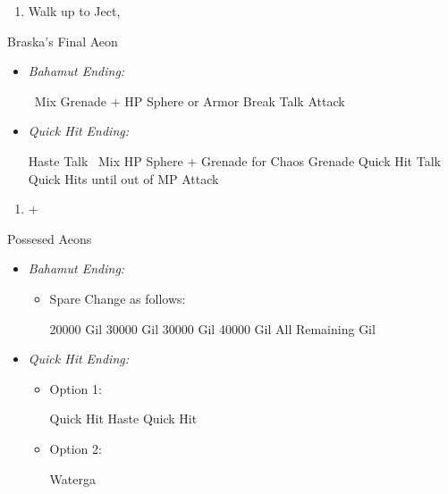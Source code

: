 \begin{multicols}{2}
\begin{enumerate}[resume]
	\item Walk up to Ject, \cs[4:30]
\end{enumerate}
\begin{battle}[180000]{Braska's Final Aeon}
\begin{itemize}
	\item \textit{Bahamut Ending:}
	\begin{itemize}
		\switch{\yuna}{\rikku}
		\rikkuf \od\ Mix Grenade + HP Sphere or Armor Break
		\tidusf Talk
		\switch{\auron}{\yuna}
		\summon{\bahamut}
		\bahamutf Attack
	\end{itemize}
	\item \textit{Quick Hit Ending:}
	\begin{itemize}
		\yunaf Haste \yuna
		\tidusf Talk
		\switch{\auron}{\rikku}
		\rikkuf \od\ Mix HP Sphere + Grenade for Chaos Grenade
		\yunaf Quick Hit
		\tidusf Talk
		\yunaf Quick Hits until out of MP
		\summon{\bahamut}
		\bahamutf Attack
	\end{itemize}
\end{itemize}
\end{battle}
\begin{enumerate}[resume]
	\item \cs+\skippablefmv[4:00]
\end{enumerate}
\begin{battle}{Possesed Aeons}
\begin{itemize}
	\item \textit{Bahamut Ending:}
	\begin{itemize}
		\item Spare Change as follows:
		\begin{itemize}
			\valeforf \num{20000} Gil
			\ifritf \num{30000} Gil
			\ixilonf \num{30000} Gil
			\bahamutf \num{40000} Gil
			\shivaf All Remaining Gil
		\end{itemize}
	\end{itemize}
	\item \textit{Quick Hit Ending:}
	\begin{itemize}
		\yunaf Elixir \yuna
		\item Option 1:
		\begin{itemize}
			\yunaf Quick Hit
			\yunaf Haste \yuna
			\yunaf Quick Hit
		\end{itemize}
		\item Option 2:
		\begin{itemize}
			\valeforf Waterga

\end{itemize}
\end{itemize}
\end{itemize}
\end{battle}
\end{multicols}
